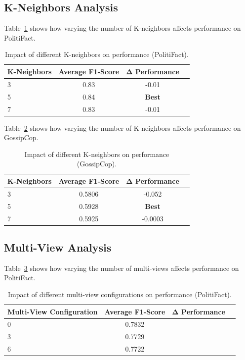 \subsection{K-Neighbors Analysis}

Table~\ref{tab:hyperparameter_k_neighbors_politifact} shows how varying the number of K-neighbors affects performance on PolitiFact.

\begin{table}[htbp]
\centering
\caption{Impact of different K-neighbors on performance (PolitiFact).}
\label{tab:hyperparameter_k_neighbors_politifact}
\begin{tabular}{lccc}
\toprule
\textbf{K-Neighbors} & \textbf{Average F1-Score} & \textbf{Δ Performance} \\
\midrule
3 & 0.83 & -0.01 \\
5 & 0.84 & \textbf{Best} \\
7 & 0.83 & -0.01 \\
\bottomrule
\end{tabular}
\end{table}


Table~\ref{tab:hyperparameter_k_neighbors_gossipcop} shows how varying the number of K-neighbors affects performance on GossipCop.

\begin{table}[htbp]
\centering
\caption{Impact of different K-neighbors on performance (GossipCop).}
\label{tab:hyperparameter_k_neighbors_gossipcop}
\begin{tabular}{lccc}
\toprule
\textbf{K-Neighbors} & \textbf{Average F1-Score} & \textbf{Δ Performance} \\
\midrule
3 & 0.5806 & -0.052 \\
5 & 0.5928 & \textbf{Best} \\
7 & 0.5925 & -0.0003 \\
\bottomrule
\end{tabular}
\end{table}

\subsection{Multi-View Analysis}

Table~\ref{tab:hyperparameter_multi_view_politifact} shows how varying the number of multi-views affects performance on PolitiFact.

\begin{table}[htbp]
\centering
\caption{Impact of different multi-view configurations on performance (PolitiFact).}
\label{tab:hyperparameter_multi_view_politifact}
\begin{tabular}{lccc}
\toprule
\textbf{Multi-View Configuration} & \textbf{Average F1-Score} & \textbf{Δ Performance} \\
\midrule
0 & 0.7832 & \- \\
3 & 0.7729 & \- \\
6 & 0.7722 & \-0.01 \\
\bottomrule
\end{tabular}
\end{table}

